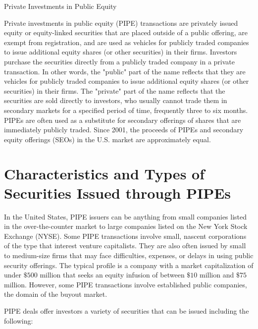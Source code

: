 \documentclass[11pt]{article}
\begin{document}
Private Investments in Public Equity

Private investments in public equity (PIPE) transactions are privately issued equity or equity-linked securities that are placed outside of a public offering, are exempt from registration, and are used as vehicles for publicly traded companies to issue additional equity shares (or other securities) in their firms. Investors purchase the securities directly from a publicly traded company in a private transaction. In other words, the "public" part of the name reflects that they are vehicles for publicly traded companies to issue additional equity shares (or other securities) in their firms. The "private" part of the name reflects that the securities are sold directly to investors, who usually cannot trade them in secondary markets for a specified period of time, frequently three to six months. PIPEs are often used as a substitute for secondary offerings of shares that are immediately publicly traded. Since 2001, the proceeds of PIPEs and secondary equity offerings (SEOs) in the U.S. market are approximately equal.

\section*{Characteristics and Types of Securities Issued through PIPEs}
In the United States, PIPE issuers can be anything from small companies listed in the over-the-counter market to large companies listed on the New York Stock Exchange (NYSE). Some PIPE transactions involve small, nascent corporations of the type that interest venture capitalists. They are also often issued by small to medium-size firms that may face difficulties, expenses, or delays in using public security offerings. The typical profile is a company with a market capitalization of under $\$ 500$ million that seeks an equity infusion of between $\$ 10$ million and $\$ 75$ million. However, some PIPE transactions involve established public companies, the domain of the buyout market.

PIPE deals offer investors a variety of securities that can be issued including the following:
\end{document}
